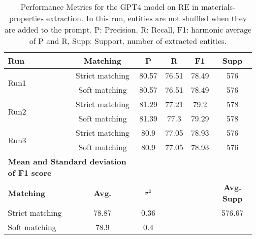 \begin{table}[htbp]
    \small
    \centering
    \caption{Performance Metrics for the GPT4 model on RE in materials-properties extraction. In this run, entities are not shuffled when they are added to the prompt. P: Precision, R: Recall, F1: harmonic average of P and R, Supp: Support, number of extracted entities.}
    \begin{tabular}{lccccc}
        \toprule
        \textbf{Run} & \textbf{Matching} & \textbf{P} & \textbf{R} & \textbf{F1} & \textbf{Supp} \\
        \midrule
        \multirow{2}{*}{Run1} & Strict matching & 80.57 & 76.51 & 78.49 & 576 \\
        & Soft matching & 80.57 & 76.51 & 78.49 & 576 \\
        \midrule
        \multirow{2}{*}{Run2} & Strict matching & 81.29 & 77.21 & 79.2 & 578 \\
        & Soft matching & 81.39 & 77.3 & 79.29 & 578 \\
        \midrule
        \multirow{2}{*}{Run3} & Strict matching & 80.9 & 77.05 & 78.93 & 576 \\
        & Soft matching & 80.9 & 77.05 & 78.93 & 576 \\
        \midrule
        \multicolumn{2}{l}{\textbf{Mean and Standard deviation of F1 score}} & & & & \\
        \midrule
        \textbf{Matching} & \textbf{Avg.} & $\sigma\textsuperscript{2}$ & & & \textbf{Avg. Supp}\\
        Strict matching & 78.87 & 0.36 & & & 576.67 \\
        Soft matching & 78.9 & 0.4 & & \\
        \bottomrule
    \end{tabular}
\end{table}


